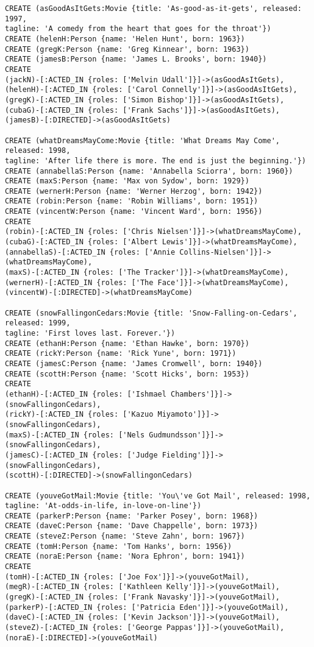 \begin{lstlisting}
CREATE (asGoodAsItGets:Movie {title: 'As-good-as-it-gets', released: 1997,
tagline: 'A comedy from the heart that goes for the throat'})
CREATE (helenH:Person {name: 'Helen Hunt', born: 1963})
CREATE (gregK:Person {name: 'Greg Kinnear', born: 1963})
CREATE (jamesB:Person {name: 'James L. Brooks', born: 1940})
CREATE
(jackN)-[:ACTED_IN {roles: ['Melvin Udall']}]->(asGoodAsItGets),
(helenH)-[:ACTED_IN {roles: ['Carol Connelly']}]->(asGoodAsItGets),
(gregK)-[:ACTED_IN {roles: ['Simon Bishop']}]->(asGoodAsItGets),
(cubaG)-[:ACTED_IN {roles: ['Frank Sachs']}]->(asGoodAsItGets),
(jamesB)-[:DIRECTED]->(asGoodAsItGets)

CREATE (whatDreamsMayCome:Movie {title: 'What Dreams May Come', released: 1998,
tagline: 'After life there is more. The end is just the beginning.'})
CREATE (annabellaS:Person {name: 'Annabella Sciorra', born: 1960})
CREATE (maxS:Person {name: 'Max von Sydow', born: 1929})
CREATE (wernerH:Person {name: 'Werner Herzog', born: 1942})
CREATE (robin:Person {name: 'Robin Williams', born: 1951})
CREATE (vincentW:Person {name: 'Vincent Ward', born: 1956})
CREATE
(robin)-[:ACTED_IN {roles: ['Chris Nielsen']}]->(whatDreamsMayCome),
(cubaG)-[:ACTED_IN {roles: ['Albert Lewis']}]->(whatDreamsMayCome),
(annabellaS)-[:ACTED_IN {roles: ['Annie Collins-Nielsen']}]->(whatDreamsMayCome),
(maxS)-[:ACTED_IN {roles: ['The Tracker']}]->(whatDreamsMayCome),
(wernerH)-[:ACTED_IN {roles: ['The Face']}]->(whatDreamsMayCome),
(vincentW)-[:DIRECTED]->(whatDreamsMayCome)

CREATE (snowFallingonCedars:Movie {title: 'Snow-Falling-on-Cedars', released: 1999,
tagline: 'First loves last. Forever.'})
CREATE (ethanH:Person {name: 'Ethan Hawke', born: 1970})
CREATE (rickY:Person {name: 'Rick Yune', born: 1971})
CREATE (jamesC:Person {name: 'James Cromwell', born: 1940})
CREATE (scottH:Person {name: 'Scott Hicks', born: 1953})
CREATE
(ethanH)-[:ACTED_IN {roles: ['Ishmael Chambers']}]->(snowFallingonCedars),
(rickY)-[:ACTED_IN {roles: ['Kazuo Miyamoto']}]->(snowFallingonCedars),
(maxS)-[:ACTED_IN {roles: ['Nels Gudmundsson']}]->(snowFallingonCedars),
(jamesC)-[:ACTED_IN {roles: ['Judge Fielding']}]->(snowFallingonCedars),
(scottH)-[:DIRECTED]->(snowFallingonCedars)

CREATE (youveGotMail:Movie {title: 'You\'ve Got Mail', released: 1998,
tagline: 'At-odds-in-life, in-love-on-line'})
CREATE (parkerP:Person {name: 'Parker Posey', born: 1968})
CREATE (daveC:Person {name: 'Dave Chappelle', born: 1973})
CREATE (steveZ:Person {name: 'Steve Zahn', born: 1967})
CREATE (tomH:Person {name: 'Tom Hanks', born: 1956})
CREATE (noraE:Person {name: 'Nora Ephron', born: 1941})
CREATE
(tomH)-[:ACTED_IN {roles: ['Joe Fox']}]->(youveGotMail),
(megR)-[:ACTED_IN {roles: ['Kathleen Kelly']}]->(youveGotMail),
(gregK)-[:ACTED_IN {roles: ['Frank Navasky']}]->(youveGotMail),
(parkerP)-[:ACTED_IN {roles: ['Patricia Eden']}]->(youveGotMail),
(daveC)-[:ACTED_IN {roles: ['Kevin Jackson']}]->(youveGotMail),
(steveZ)-[:ACTED_IN {roles: ['George Pappas']}]->(youveGotMail),
(noraE)-[:DIRECTED]->(youveGotMail)


\end{lstlisting}
